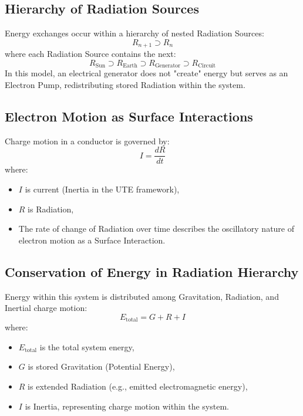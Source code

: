 \documentclass{article}
\begin{document}
\subsection{Hierarchy of Radiation Sources}
Energy exchanges occur within a hierarchy of nested Radiation Sources:
\begin{equation}
    R_{n+1} \supset R_n
\end{equation}
where each Radiation Source contains the next:
\begin{equation}
    R_{\text{Sun}} \supset R_{\text{Earth}} \supset R_{\text{Generator}} \supset R_{\text{Circuit}}
\end{equation}
In this model, an electrical generator does not "create" energy but serves as an Electron Pump, redistributing stored Radiation within the system.

\subsection{Electron Motion as Surface Interactions}
Charge motion in a conductor is governed by:
\begin{equation}
    I = \frac{dR}{dt}
\end{equation}
where:
\begin{itemize}
    \item $I$ is current (Inertia in the UTE framework),
    \item $R$ is Radiation,
    \item The rate of change of Radiation over time describes the oscillatory nature of electron motion as a Surface Interaction.
\end{itemize}

\subsection{Conservation of Energy in Radiation Hierarchy}
Energy within this system is distributed among Gravitation, Radiation, and Inertial charge motion:
\begin{equation}
    E_{\text{total}} = G + R + I
\end{equation}
where:
\begin{itemize}
    \item $E_{\text{total}}$ is the total system energy,
    \item $G$ is stored Gravitation (Potential Energy),
    \item $R$ is extended Radiation (e.g., emitted electromagnetic energy),
    \item $I$ is Inertia, representing charge motion within the system.
\end{itemize}
\end{document}
